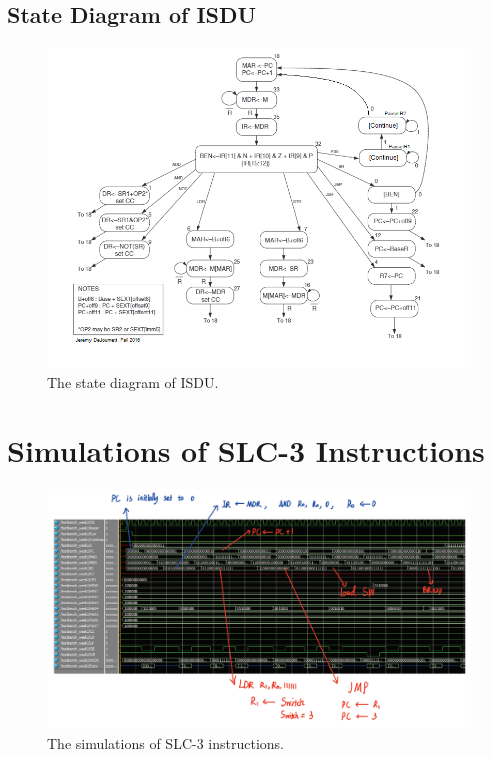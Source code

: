 \documentclass[12pt]{article}
\begin{document}
\subsection{State Diagram of ISDU
}
\begin{figure}[H]
    \centering
    \includegraphics[width=15cm]{states.png}
    \caption{The state diagram of ISDU.}
\end{figure}

\section{Simulations of SLC-3 Instructions}
\begin{figure}[H]
    \centering
    \includegraphics[width=15cm]{simulation.png}
    \caption{The simulations of SLC-3 instructions.}
\end{figure}
\end{document}
